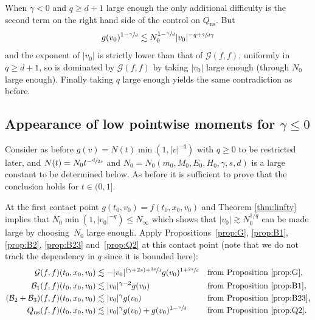 \documentclass[JEP,XML,SOM,Unicode,NoFloatCountersInSection]{cedram}
\newcommand{\ns}{\mathrm{ns}}
\theoremstyle{plain}
\theoremstyle{definition}
\numberwithin{equation}{section}
\let\A N
\newcommand{\Ao}{N_0}
\newcommand{\Ai}{N_\infty}
\begin{document}
When $\gamma <0$ and $q \ge d+1$ large enough the only additional
difficulty is the second term on the right hand side of the control on
$Q_{\ns}$. But
\[
g(v_0)^{1-\sfrac{\gamma}{d}} \lesssim \Ao^{1-\sfrac{\gamma}{d}} |v_0|^{-q + \sfrac{q}{d}\gamma}
\]
and the exponent of $|v_0|$ is strictly lower than that of
$\mathcal{G}(f,f)$, uniformly in $q \ge d+1$, so is dominated by
$\mathcal{G}(f,f)$ by taking $|v_0|$ large enough (through $\Ao$ large
enough). Finally taking $q$ large enough yields the same contradiction
as before.

\subsection{Appearance of low pointwise moments for $\gamma \le 0$}

Consider as before $g(v) =\A (t) \min(1,|v|^{-q})$ with $q \ge 0$ to
be restricted later, and $\A(t) = \Ao t^{-\sfrac d {2s}}$ and
$\Ao = \Ao(m_0,M_0,E_0,H_0,\gamma,s,d)$ is a large constant to be
determined below. As before it is sufficient to prove that the
conclusion holds for $t \in (0,1]$.

At the first contact point $g(t_0,v_0)=f(t_0,x_0,v_0)$ and Theorem
\ref{thm:linfty} implies that $\Ao \min(1,|v_0|^{-q}) \leq \Ai$ which
shows that $|v_0| \gtrsim N_0^{1/q}$ can be made large by choosing~$N_0$ large enough. Apply Propositions~\ref{prop:G}, \ref{prop:B1},
\ref{prop:B2}, \ref{prop:B23} and~\ref{prop:Q2} at this contact point
(note that we do not track the dependency in $q$ since it is bounded here):
\begin{align*}
\mathcal G(f,f)(t_0,x_0,v_0)
&\lesssim - |v_0|^{(\gamma+2s)+\sfrac{2s}d} g(v_0)^{1+\sfrac{2s}d}
&& \text{from Proposition \ref{prop:G}}, \\
\mathcal B_1 (f,f)(t_0,x_0,v_0)
&\lesssim |v_0|^{\gamma-2} g(v_0)
&& \text{from Proposition \ref{prop:B1}}, \\
(\mathcal B_2 + \mathcal B_3 )(f,f)(t_0,x_0,v_0)
&\lesssim |v_0|^{\gamma} g(v_0)
&& \text{from Proposition \ref{prop:B23},}\\
Q_{\ns}(f,f)(t_0,x_0,v_0)
&\lesssim |v_0|^{\gamma} g(v_0) + g(v_0)^{1-\sfrac{\gamma}d}
&& \text{from Proposition \ref{prop:Q2}}.
\end{align*}
\end{document}
